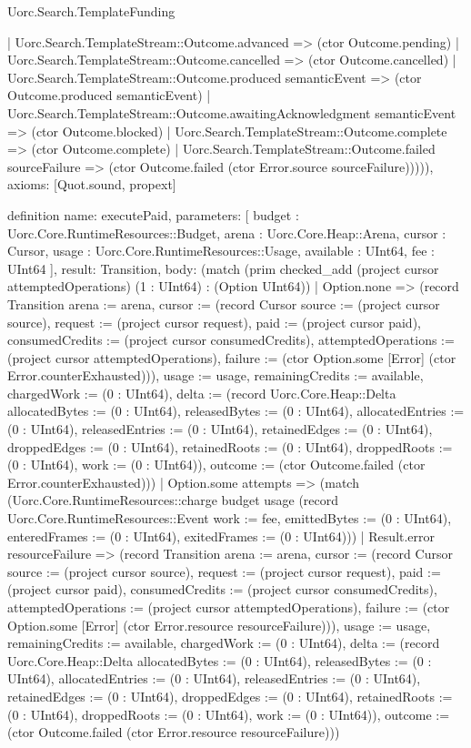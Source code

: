\begin{lexlean}{Uorc.Search.TemplateFunding}
\begin{semanticmodule}
{{      | Uorc.Search.TemplateStream::Outcome.advanced => (ctor Outcome.pending)
      | Uorc.Search.TemplateStream::Outcome.cancelled => (ctor Outcome.cancelled)
      | Uorc.Search.TemplateStream::Outcome.produced semanticEvent => (ctor Outcome.produced semanticEvent)
      | Uorc.Search.TemplateStream::Outcome.awaitingAcknowledgment semanticEvent => (ctor Outcome.blocked)
      | Uorc.Search.TemplateStream::Outcome.complete => (ctor Outcome.complete)
      | Uorc.Search.TemplateStream::Outcome.failed sourceFailure => (ctor Outcome.failed (ctor Error.source sourceFailure)))})),
  axioms: [Quot.sound, propext]
}

definition{
  name: executePaid,
  parameters: [
    budget : Uorc.Core.RuntimeResources::Budget,
    arena : Uorc.Core.Heap::Arena,
    cursor : Cursor,
    usage : Uorc.Core.RuntimeResources::Usage,
    available : UInt64,
    fee : UInt64
  ],
  result: Transition,
  body: (match (prim checked_add (project cursor attemptedOperations) (1 : UInt64) : (Option UInt64))
    | Option.none => (record Transition {arena := arena, cursor := (record Cursor {source := (project cursor source), request := (project cursor request), paid := (project cursor paid), consumedCredits := (project cursor consumedCredits), attemptedOperations := (project cursor attemptedOperations), failure := (ctor Option.some [Error] (ctor Error.counterExhausted))}), usage := usage, remainingCredits := available, chargedWork := (0 : UInt64), delta := (record Uorc.Core.Heap::Delta {allocatedBytes := (0 : UInt64), releasedBytes := (0 : UInt64), allocatedEntries := (0 : UInt64), releasedEntries := (0 : UInt64), retainedEdges := (0 : UInt64), droppedEdges := (0 : UInt64), retainedRoots := (0 : UInt64), droppedRoots := (0 : UInt64), work := (0 : UInt64)}), outcome := (ctor Outcome.failed (ctor Error.counterExhausted))})
    | Option.some attempts => (match (Uorc.Core.RuntimeResources::charge budget usage (record Uorc.Core.RuntimeResources::Event {work := fee, emittedBytes := (0 : UInt64), enteredFrames := (0 : UInt64), exitedFrames := (0 : UInt64)}))
      | Result.error resourceFailure => (record Transition {arena := arena, cursor := (record Cursor {source := (project cursor source), request := (project cursor request), paid := (project cursor paid), consumedCredits := (project cursor consumedCredits), attemptedOperations := (project cursor attemptedOperations), failure := (ctor Option.some [Error] (ctor Error.resource resourceFailure))}), usage := usage, remainingCredits := available, chargedWork := (0 : UInt64), delta := (record Uorc.Core.Heap::Delta {allocatedBytes := (0 : UInt64), releasedBytes := (0 : UInt64), allocatedEntries := (0 : UInt64), releasedEntries := (0 : UInt64), retainedEdges := (0 : UInt64), droppedEdges := (0 : UInt64), retainedRoots := (0 : UInt64), droppedRoots := (0 : UInt64), work := (0 : UInt64)}), outcome := (ctor Outcome.failed (ctor Error.resource resourceFailure))})
}
\end{semanticmodule}
\end{lexlean}
